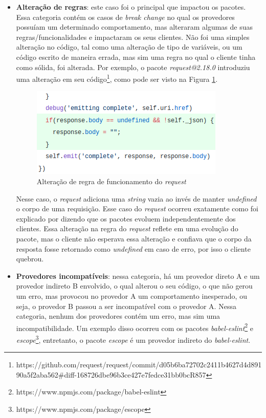 \begin{itemize}
    \item \textbf{Alteração de regras}: este caso foi o principal que impactou os pacotes. Essa categoria contém os casos de \textit{break change} no qual os provedores possuíam um determinado comportamento, mas alteraram algumas de suas regras/funcionalidades e impactaram os seus clientes. Não foi uma simples alteração no código, tal como uma alteração de tipo de variáveis, ou um código escrito de maneira errada, mas sim uma regra no qual o cliente tinha como sólida, foi alterada. Por exemplo, o pacote \textit{request@2.18.0} introduziu uma alteração em seu código\footnote{https://github.com/request/request/commit/d05b6ba72702c2411b4627d4d89190a5f2aba562\#diff-168726dbe96b3ce427e7fedce31bb0bcR857}, como pode ser visto na Figura \ref{fig:bc_category_change_rule_1}.

    \begin{figure}
        \centering
        \includegraphics[scale=0.6]{figuras/bc_category_change_rule_1.png}
        \caption{Alteração de regra de funcionamento do \textit{request}}
        \label{fig:bc_category_change_rule_1}
    \end{figure}{}

    Nesse caso, o \textit{request} adiciona uma \textit{string} vazia ao invés de manter \textit{undefined} o corpo de uma requisição. Esse caso do \textit{request} ocorreu exatamente como foi explicado por  dizendo que os pacotes evoluem independentemente dos clientes. Essa alteração na regra do \textit{request} reflete em uma evolução do pacote, mas o cliente não esperava essa alteração e confiava que o corpo da resposta fosse retornado como \textit{undefined} em caso de erro, por isso o cliente quebrou.

    \item \textbf{Provedores incompatíveis}: nessa categoria, há um provedor direto A e um provedor indireto B envolvido, o qual alterou o seu código, o que não gerou um erro, mas provocou no provedor A um comportamento inesperado, ou seja, o provedor B passou a ser incompatível com o provedor A. Nessa categoria, nenhum dos provedores contém um erro, mas sim uma incompatibilidade. Um exemplo disso ocorreu com os pacotes \textit{babel-eslint}\footnote{https://www.npmjs.com/package/babel-eslint} e \textit{escope}\footnote{https://www.npmjs.com/package/escope}, entretanto, o pacote \textit{escope} é um provedor indireto do \textit{babel-eslint}.


\end{itemize}
